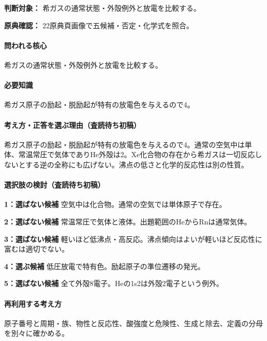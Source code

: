 \noindent\textbf{判断対象：} 希ガスの通常状態・外殻例外と放電を比較する。\par

\noindent\textbf{原典確認：} 22原典頁画像で五候補・否定・化学式を照合。\par

\paragraph{問われる核心} 希ガスの通常状態・外殻例外と放電を比較する。

\paragraph{必要知識} 希ガス原子の励起・脱励起が特有の放電色を与えるので4。

\paragraph{考え方・正答を選ぶ理由（査読待ち初稿）} 希ガス原子の励起・脱励起が特有の放電色を与えるので4。通常の空気中は単体、常温常圧で気体でありHe外殻は2。Xe化合物の存在から希ガスは一切反応しないとする逆の全称にも広げない。沸点の低さと化学的反応性は別の性質。

\paragraph{選択肢の検討（査読待ち初稿）}\mbox{}\par

\noindent\textbf{1：選ばない候補} 空気中は化合物。通常の空気では単体原子で存在。\par

\noindent\textbf{2：選ばない候補} 常温常圧で気体と液体。出題範囲のHeからRnは通常気体。\par

\noindent\textbf{3：選ばない候補} 軽いほど低沸点・高反応。沸点傾向はよいが軽いほど反応性に富むは適切でない。\par

\noindent\textbf{4：選ぶ候補} 低圧放電で特有色。励起原子の準位遷移の発光。\par

\noindent\textbf{5：選ばない候補} 全て外殻8電子。Heの1s2は外殻2電子という例外。\par

\paragraph{再利用する考え方} 原子番号と周期・族、物性と反応性、酸強度と危険性、生成と除去、定義の分母を別々に確かめる。

